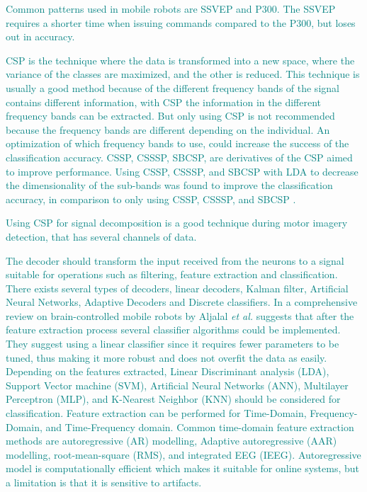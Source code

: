 \textcolor{teal}{
	Common patterns used in mobile robots are SSVEP and P300\cite{aljalalComprehensiveReviewBraincontrolled2020}. The SSVEP requires a shorter time when issuing commands compared to the P300, but loses out in accuracy\cite{aljalalComprehensiveReviewBraincontrolled2020}.
}

\textcolor{teal}{
	CSP is the technique where the data is transformed into a new space, where the variance of the classes are maximized, and the other is reduced. This technique is usually a good method because of the different frequency bands of the signal contains different information, with CSP the information in the different frequency bands can be extracted. But only using CSP is not recommended because the frequency bands are different depending on the individual\cite{padfieldEEGBasedBrainComputerInterfaces2019}. An optimization of which frequency bands to use, could increase the success of the classification accuracy\cite{padfieldEEGBasedBrainComputerInterfaces2019}.
	CSSP, CSSSP, SBCSP, are derivatives of the CSP aimed to improve performance. Using CSSP, CSSSP, and SBCSP with LDA to decrease the dimensionality of the sub-bands was found to improve the classification accuracy, in comparison to only using CSSP, CSSSP, and SBCSP
	\cite{oikonomouComparisonStudyEEG2017}.
}

\textcolor{teal}{Using CSP for signal decomposition is a good technique during motor imagery detection, that has several channels of data\cite{kevricComparisonSignalDecomposition2017}.}

\textcolor{teal}{
	The decoder should transform the input received from the neurons to a signal suitable for operations such as filtering, feature extraction and classification. There exists several types of decoders, linear decoders, Kalman filter, Artificial Neural Networks, Adaptive Decoders and Discrete classifiers.
	In a comprehensive review on brain-controlled mobile robots by Aljalal \textit{et al.} suggests that after the feature extraction process several classifier algorithms could be implemented. They suggest using a linear classifier since it requires fewer parameters to be tuned, thus making it more robust and does not overfit the data as easily\cite{aljalalComprehensiveReviewBraincontrolled2020}. Depending on the features extracted, Linear Discriminant analysis (LDA), Support Vector machine (SVM), Artificial Neural Networks (ANN), Multilayer Perceptron (MLP), and K-Nearest Neighbor (KNN) should be considered for classification.
}
\textcolor{teal}{
	Feature extraction can be performed for Time-Domain, Frequency-Domain, and Time-Frequency domain. Common time-domain feature extraction methods are autoregressive (AR) modelling, Adaptive autoregressive (AAR) modelling, root-mean-square (RMS), and integrated EEG (IEEG)\cite{padfieldEEGBasedBrainComputerInterfaces2019}.
}
\textcolor{teal}{Autoregressive model is computationally efficient which makes it suitable for online systems, but a limitation is that it is sensitive to artifacts\cite{kevricComparisonSignalDecomposition2017}.}

